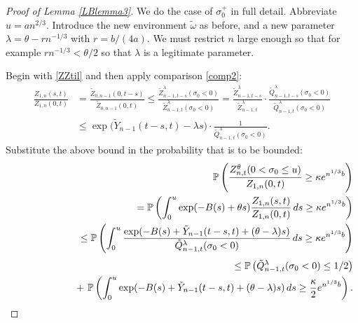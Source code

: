 \documentclass[11pt]{amsart}
\numberwithin{equation}{section}
\theoremstyle{remark}
\begin{document}
\begin{proof}[Proof of Lemma \ref{LBlemma3}]
  We do the case of $\sigma^+_0$ in full detail.  Abbreviate $u={a} n^{2/3}$.  
Introduce the new environment $\tilde \omega$ as before, and a new parameter
  $\lambda={\theta}-r  n^{-1/3}$ with $r =b/(4a)$.  
 We must restrict $n$ large enough so that for example $rn^{-1/3}<{\theta}/2$ so that
 $\lambda$ is a legitimate parameter.   
  
Begin with \eqref{ZZtil}   and then apply   comparison  \eqref{comp2}: 
\begin{align*}
\frac{Z_{1,n}(s,t)}{Z_{1,n}(0,t)}& =\frac{\tilde Z_{0,n-1}(0,t-s)}{\tilde Z_{0,n-1}(0,t)} \le \frac{{\tilde Z}_{n-1,t-s}^{\lambda}(\sigma_0<0)}{{\tilde Z}_{n-1,t}^{\lambda}(\sigma_0<0)}=
\frac{{\tilde Z}_{n-1,t-s}^{\lambda}}{{\tilde Z}_{n-1,t}^{\lambda}}\cdot \frac{\tilde Q^{\lambda}_{n-1,t-s}(\sigma_0<0)}{\tilde Q^{\lambda}_{n-1,t}(\sigma_0<0)}\\
&\le  \exp\bigl(\tilde Y_{n-1}(t-s,t)-\lambda s\bigr)\cdot \frac{1}{\tilde Q^{\lambda}_{n-1,t}(\sigma_0<0)}. 
\end{align*}
Substitute the above bound in the probability that is to be bounded:   
\begin{eqnarray} {\nonumber}&&
{\mathbb{P}}\left(\frac{Z^{\theta}_{n,t}( 0< \sigma_0\le u)}{Z_{1,n}(0,t)}\ge\kappa e^{n^{1/3}{b} }\right)\\
&&\hskip10mm {\nonumber} ={\mathbb{P}}\left(\int_0^u \exp(-B(s)+{\theta} s) \frac{Z_{1,n}(s,t)}{Z_{1,n}(0,t)}\, ds
\ge \kappa  e^{n^{1/3}  b}  \right)\\
&&\hskip10mm {\nonumber} \le
{\mathbb{P}}\left(\int_0^u \frac{ \exp(-B(s)+\tilde Y_{n-1}(t-s,t)+({\theta}-\lambda) s)  }{\tilde Q^{\lambda}_{n-1,t}(\sigma_0<0)}\,ds\ge\kappa e^{n^{1/3}  {b}}\right)\\[3pt] 
&&\hskip10mm
\le{\mathbb{P}}\left(\tilde Q^{\lambda}_{n-1,t}(\sigma_0<0)\le 1/2\right)\label{eq:lower3.9} \\
&&\hskip20mm
+ \ {\mathbb{P}}\left(\int_0^u \exp(-B(s)+\tilde Y_{n-1}(t-s,t)+({\theta}-\lambda) s) \, ds\ge \frac\kappa{2}  e^{n^{1/3}  {b}}\right).\label{eq:lower4}
\end{eqnarray} 


\end{proof}
\end{document}
